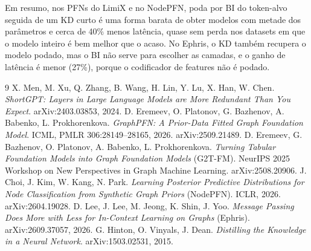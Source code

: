 \documentclass[12pt,a4paper]{article}
\begin{document}
Em resumo, nos PFNs do LimiX e no NodePFN, poda por BI do token-alvo seguida de um KD curto é uma forma barata de obter modelos com metade dos parâmetros e cerca de 40\% menos latência, quase sem perda nos datasets em que o modelo inteiro é bem melhor que o acaso. No Ephris, o KD também recupera o modelo podado, mas o BI não serve para escolher as camadas, e o ganho de latência é menor (27\%), porque o codificador de features não é podado.


\begin{thebibliography}{9}
 X. Men, M. Xu, Q. Zhang, B. Wang, H. Lin, Y. Lu, X. Han, W. Chen. \emph{ShortGPT: Layers in Large Language Models are More Redundant Than You Expect}. arXiv:2403.03853, 2024.
 D. Eremeev, O. Platonov, G. Bazhenov, A. Babenko, L. Prokhorenkova. \emph{GraphPFN: A Prior-Data Fitted Graph Foundation Model}. ICML, PMLR 306:28149--28165, 2026. arXiv:2509.21489.
 D. Eremeev, G. Bazhenov, O. Platonov, A. Babenko, L. Prokhorenkova. \emph{Turning Tabular Foundation Models into Graph Foundation Models} (G2T-FM). NeurIPS 2025 Workshop on New Perspectives in Graph Machine Learning. arXiv:2508.20906.
 J. Choi, J. Kim, W. Kang, N. Park. \emph{Learning Posterior Predictive Distributions for Node Classification from Synthetic Graph Priors} (NodePFN). ICLR, 2026. arXiv:2604.19028.
 D. Lee, J. Lee, M. Jeong, K. Shin, J. Yoo. \emph{Message Passing Does More with Less for In-Context Learning on Graphs} (Ephris). arXiv:2609.37057, 2026.
 G. Hinton, O. Vinyals, J. Dean. \emph{Distilling the Knowledge in a Neural Network}. arXiv:1503.02531, 2015.
\end{thebibliography}
\end{document}
